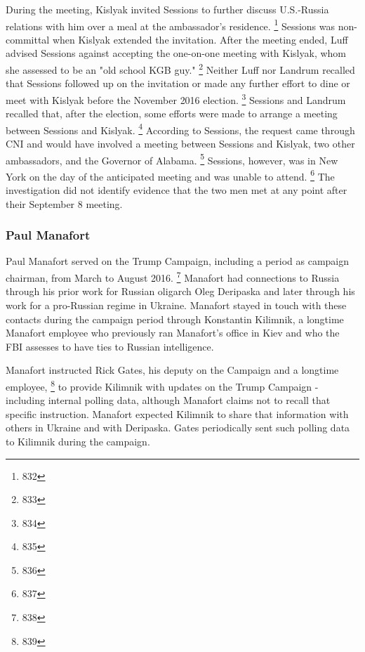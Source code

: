 During the meeting, Kislyak invited Sessions to further discuss U.S.-Russia relations with him over a meal at the ambassador's residence.%
\footnote{832}
Sessions was non-committal when Kislyak extended the invitation.
After the meeting ended, Luff advised Sessions against accepting the one-on-one meeting with Kislyak, whom she assessed to be an "old school KGB guy."%
\footnote{833}
Neither Luff nor Landrum recalled that Sessions followed up on the invitation or made any further effort to dine or meet with Kislyak before the November 2016 election.%
\footnote{834}
Sessions and Landrum recalled that, after the election, some efforts were made to arrange a meeting between Sessions and Kislyak.%
\footnote{835}
According to Sessions, the request came through CNI and would have involved a meeting between Sessions and Kislyak, two other ambassadors, and the Governor of Alabama.%
\footnote{836}
Sessions, however, was in New York on the day of the anticipated meeting and was unable to attend.%
\footnote{837}
The investigation did not identify evidence that the two men met at any point after their September 8 meeting.

\subsubsection{Paul Manafort}

Paul Manafort served on the Trump Campaign, including a period as campaign chairman, from March to August 2016.%
\footnote{838}
Manafort had connections to Russia through his prior work for Russian oligarch Oleg Deripaska and later through his work for a pro-Russian regime in Ukraine.
Manafort stayed in touch with these contacts during the campaign period through Konstantin Kilimnik, a longtime Manafort employee who previously ran Manafort's office in Kiev and who the FBI assesses to have ties to Russian intelligence.

Manafort instructed Rick Gates, his deputy on the Campaign and a longtime employee, %
\footnote{839}
to provide Kilimnik with updates on the Trump Campaign - including internal polling data, although Manafort claims not to recall that specific instruction.
Manafort expected Kilimnik to share that information with others in Ukraine and with Deripaska.
Gates periodically sent such polling data to Kilimnik during the campaign.

